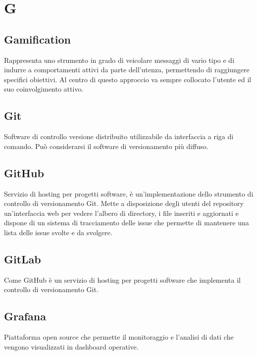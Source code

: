 \section*{G}

\subsection{Gamification}
Rappresenta uno strumento in grado di veicolare messaggi di vario tipo e di indurre a comportamenti attivi da parte dell’utenza, permettendo di raggiungere specifici obiettivi. Al centro di questo approccio va sempre collocato l'utente ed il suo coinvolgimento attivo.

\subsection{Git}
Software di controllo versione distribuito utilizzabile da interfaccia a riga di comando. Può considerarsi il software di versionamento più diffuso.

\subsection{GitHub}
Servizio di hosting per progetti software, è un'implementazione dello strumento di controllo di versionamento Git. Mette a disposizione degli utenti del repository un'interfaccia web per vedere l'albero di directory, i file inseriti e aggiornati e dispone di un sistema di tracciamento delle issue che permette di mantenere una lista delle issue svolte e da svolgere.

\subsection{GitLab}
Come GitHub è un servizio di hosting per progetti software che implementa il controllo di versionamento Git. 

\subsection{Grafana}
Piattaforma open source che permette il monitoraggio e l'analisi di dati che vengono visualizzati in dashboard operative. 